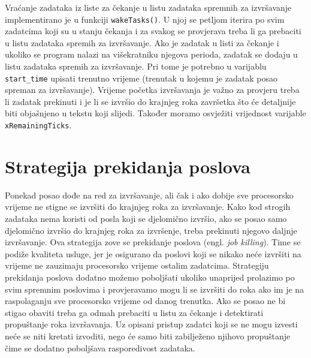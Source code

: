 \documentclass[../zavrsni.tex]{subfiles}
\begin{document}



Vraćanje zadataka iz liste za čekanje u listu zadataka spremnih za izvršavanje implementirano je u funkciji \texttt{wakeTasks()}.
U njoj se petljom iterira po svim zadatcima koji su u stanju čekanja i za svakog se provjerava treba li ga prebaciti u listu zadataka 
spremih za izvršavanje.
Ako je zadatak u listi za čekanje i ukoliko se program nalazi na višekratniku njegova perioda, zadatak se dodaju u listu 
zadataka spremih za izvršavanje. Pri tome je potrebno u varijablu \texttt{start\_time} upisati trenutno vrijeme (trenutak u kojemu je 
zadatak posao spreman za izvršavanje).  
Vrijeme početka izvršavanja je važno za provjeru treba li zadatak prekinuti i je li se izvršio do krajnjeg roka završetka 
što će detaljnije biti objašnjeno u tekstu koji slijedi.
Također moramo osvježiti vrijednost varijable \texttt{xRemainingTicks}.


\section{Strategija prekidanja poslova}

Ponekad posao dođe na red za izvršavanje, ali čak i ako dobije sve procesorsko vrijeme ne stigne se izvršiti do krajnjeg roka za izvršavanje.
Kako kod strogih zadataka nema koristi od posla koji se djelomično izvršio, ako se posao samo djelomično izvršio do krajnjeg roka za izvršenje, 
treba prekinuti njegovo daljnje izvršavanje.
 Ova strategija zove se prekidanje poslova 
 (engl. \textit{job killing}). Time se podiže kvaliteta usluge, jer je osigurano da poslovi koji se nikako neće 
 izvršiti na vrijeme ne zauzimaju procesorsko vrijeme ostalim zadatcima. Strategiju prekidanja poslova dodatno možemo poboljšati
 ukoliko unaprijed prolazimo po svim spremnim poslovima i provjeravamo mogu li se izvršiti do roka ako im je na raspolaganju sve 
 procesorsko vrijeme od danog trenutka. Ako se posao ne bi stigao obaviti treba ga odmah prebaciti u listu za čekanje i detektirati 
 propuštanje roka izvršavanja. Uz opisani pristup zadatci koji se ne mogu izvesti neće se niti kretati izvoditi, nego će samo
 biti zabilježeno njihovo propuštanje čime se dodatno poboljšava rasporedivost zadataka.
\end{document}
